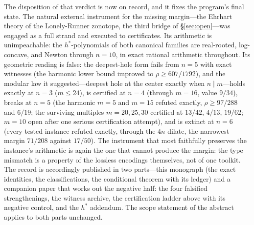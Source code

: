 The disposition of that verdict is now on record, and it fixes the
program's final state. The natural external instrument for the missing
margin---the Ehrhart theory of the Lonely-Runner zonotope, the third
bridge of \S\ref{sec:open}---was engaged as a full strand and executed
to certificates. Its arithmetic is unimpeachable: the $h^*$-polynomials
of both canonical families are real-rooted, log-concave, and Newton
through $n=10$, in exact rational arithmetic throughout. Its geometric
reading is false: the deepest-hole form fails from $n=5$ with exact
witnesses (the harmonic lower bound improved to $\rho\ge 607/1792$),
and the modular law it suggested---deepest hole at the center exactly
when $n\mid m$---holds exactly at $n=3$ ($m\le 24$), is certified at
$n=4$ (through $m=16$, value $9/34$), breaks at $n=5$ (the harmonic
$m=5$ and $m=15$ refuted exactly, $\rho\ge 97/288$ and $6/19$; the
surviving multiples $m=20,25,30$ certified at $13/42$, $4/13$,
$19/62$; $m=10$ open after one serious certification attempt), and is
extinct at $n=6$ (every tested instance refuted exactly, through the
$4n$ dilate, the narrowest margin $71/208$ against $17/50$). The
instrument that most faithfully preserves the instance's arithmetic is
again the one that cannot produce the margin: the type mismatch is a
property of the lossless encodings themselves, not of one toolkit.
The record is accordingly published in two parts---this monograph (the
exact identities, the classifications, the conditional theorem with
its ledger) and a companion paper \cite{companion-paper} that works
out the negative half: the four falsified strengthenings, the witness
archive, the certification ladder above with its negative control, and
the $h^*$ addendum. The scope statement of the abstract applies to
both parts unchanged.
